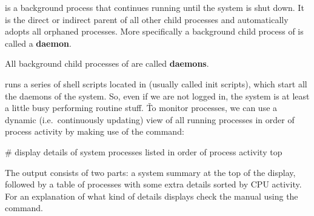  is a background process that continues running until the system is shut down. It is the direct or indirect
parent of all other child processes and automatically adopts all orphaned processes. More specifically a background
child process of  is called a \textbf{daemon}.

\bd[Daemon]
All background child processes of  are called \textbf{daemons}.
\ed

 runs a series of shell scripts located in  (usually called init scripts), which start all the
daemons of the system. So, even if we are not logged in, the system is at least a little busy performing routine stuff.
\v

To monitor processes, we can use a dynamic (i.e.\ continuously updating) view of all running processes in order of
process activity by making use of the  command:
\begin{bash}
# display details of system processes listed in order of process activity
top
\end{bash}

The  output consists of two parts: a system summary at the top of the display, followed by a table of
processes with some extra details sorted by CPU activity. For an explanation of what kind of details 
displays check the manual using the  command.

%
%
%
%
%

